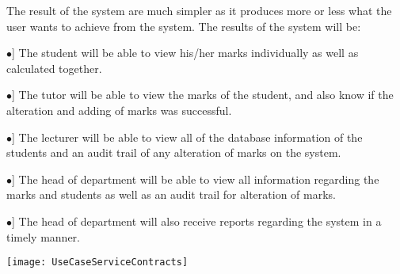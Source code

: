 \documentclass[12pt, a4paper]{scrartcl}
\newcommand{\tab}[1]{\hspace{.05\textwidth}\rlap{#1}}
\begin{document}
The result of the system are much simpler as it produces more or less what the user wants to achieve from the system. The results of the system will be:
				\begin{description}
					\item \tab [$\bullet$] The student will be able to view his/her marks individually as well as calculated together.
					\item \tab [$\bullet$] The tutor will be able to view the marks of the student, and also know if the alteration and adding of marks was successful.
					\item \tab [$\bullet$] The lecturer will be able to view all of the database information of the students and an audit trail of any alteration of marks on the system.
					\item \tab [$\bullet$] The head of department will be able to view all information regarding the marks and students as well as an audit trail for alteration of marks.
					\item \tab [$\bullet$] The head of department will also receive reports regarding the system in a timely manner.
				\end{description}
				\texttt{[image: UseCaseServiceContracts]}
\end{document}
